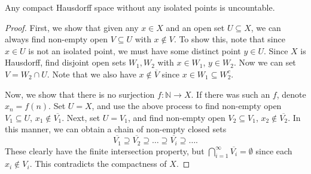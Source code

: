 \documentclass[11pt]{article}
\newcommand{\N}{\mathbb{N}}
\theoremstyle{definition}
\theoremstyle{remark}
\numberwithin{equation}{section}
\begin{document}
    \begin{theorem}
        Any compact Hausdorff space without any isolated points is uncountable.
    \end{theorem}
    \begin{proof}
        First, we show that given any $x \in X$ and an open set $U \subseteq X$, we
        can always find non-empty open $V \subseteq U$ with $x \notin V$. To show
        this, note that since $x \in U$ is not an isolated point, we must have some
        distinct point $y \in U$. Since $X$ is Hausdorff, find disjoint open sets
        $W_1, W_2$ with $x \in W_1$, $y \in W_2$. Now we can set $V = W_2 \cap U$.
        Note that we also have $x \notin \overline{V}$ since $x \in W_1 \subseteq
        W_2^c$.

        Now, we show that there is no surjection $f\colon \N \to X$. If there was
        such an $f$, denote $x_n = f(n)$. Set $U = X$, and use the above process to
        find non-empty open $V_1 \subseteq U$, $x_1 \notin \overline{V_1}$. Next, set
        $U = V_1$, and find non-empty open $V_2 \subseteq V_1$, $x_2 \notin
        \overline{V_2}$. In this manner, we can obtain a chain of non-empty closed
        sets \[
            \overline{V_1} \supseteq \overline{V_2} \supseteq \dots \supseteq
            \overline{V_i} \supseteq \dots.
        \] These clearly have the finite intersection property, but $\bigcap_{i =
        1}^\infty \overline{V_i} = \emptyset$ since each $x_i \notin V_i$. This
        contradicts the compactness of $X$.
    \end{proof}
\end{document}
